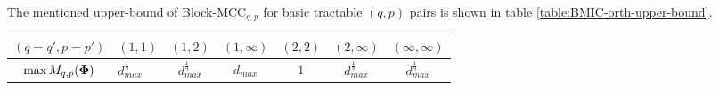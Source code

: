 The mentioned upper-bound of Block-MCC$_{q,p}$ for basic tractable $(q,p)$ pairs is shown in table \ref{table:BMIC-orth-upper-bound}.
\begin{table*}[tp]
\centering
\begin{tabular}{ccccccc}
\toprule
\multicolumn{1}{c}{$(q = q',p = p')$} &\multicolumn{1}{c}{$(1,1)$} & \multicolumn{1}{c}{$(1,2)$}  & \multicolumn{1}{c}{$(1,\infty)$} & \multicolumn{1}{c}{$(2,2)$} & \multicolumn{1}{c}{$(2,\infty)$} & \multicolumn{1}{c}{$(\infty,\infty)$}\\ \midrule %
\multicolumn{1}{c}{$\max M_{q,p}(\boldsymbol{\Phi})$} &\multicolumn{1}{l}{$d_{max}^\frac12$} & \multicolumn{1}{c}{$d_{max}^\frac12$} & \multicolumn{1}{c}{$d_{max}$} &\multicolumn{1}{c}{$1$} &\multicolumn{1}{c}{$d_{max}^\frac12$} & \multicolumn{1}{c}{$d_{max}^\frac12$}   \\ \bottomrule %
\end{tabular}
\caption{Upper-bound of Block-MCC$_{q,p}$ obtained based on the relationship with MCC, for different basic values of $(q,p)$ pairs and for a dictionary with intra-block orthonormality.}
\label{table:BMIC-orth-upper-bound}
\end{table*}